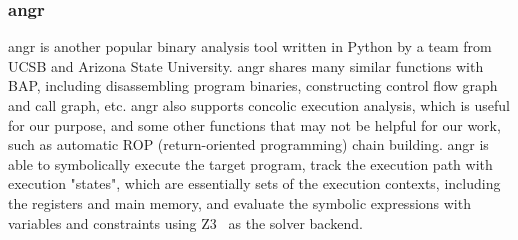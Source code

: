 \subsubsection{angr}

angr is another popular binary analysis tool written in Python by a team from
UCSB and Arizona State University. angr shares many similar functions with BAP,
including disassembling program binaries, constructing control flow graph and
call graph, etc. angr also supports concolic execution analysis, which is useful
for our purpose, and some other functions that may not be helpful for our work,
such as automatic ROP (return-oriented programming) chain building. angr is able
to symbolically execute the target program, track the execution path with
execution "states", which are essentially sets of the execution contexts,
including the registers and main memory, and evaluate the symbolic expressions
with variables and constraints using Z3~\cite{z3} as the solver backend.
